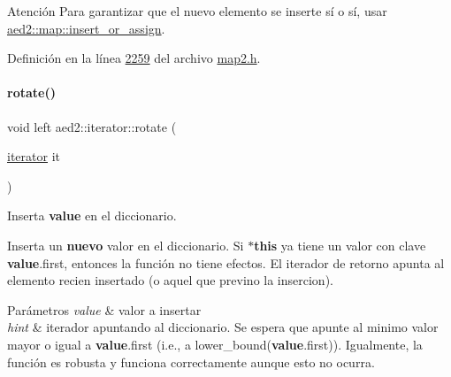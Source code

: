 \begin{DoxyAttention}{Atención}
Para garantizar que el nuevo elemento se inserte sí o sí, usar \hyperlink{classaed2_1_1map_a2ef6723c183916276b0afc4a4c721475_a2ef6723c183916276b0afc4a4c721475}{aed2\+::map\+::insert\+\_\+or\+\_\+assign}. 
\end{DoxyAttention}


Definición en la línea \hyperlink{map2_8h_source_l02259}{2259} del archivo \hyperlink{map2_8h_source}{map2.\+h}.

\mbox{\label{classaed2_1_1iterator_af4e447a081108196ecdf39b16ecb5303_af4e447a081108196ecdf39b16ecb5303}} 
\paragraph{\texorpdfstring{rotate()}{rotate()}\hspace{0.1cm}{\footnotesize\ttfamily [1/2]}}
{\footnotesize\ttfamily void left aed2\+::iterator\+::rotate (\begin{DoxyParamCaption}\item[{\hyperlink{classaed2_1_1iterator_1_1iterator}{iterator}}]{it }\end{DoxyParamCaption})\hspace{0.3cm}{\ttfamily [inline]}}



Inserta {\bfseries value} en el diccionario. 

Inserta un {\bfseries nuevo} valor en el diccionario. Si {\bfseries $\ast$this} ya tiene un valor con clave {\bfseries value}.first, entonces la función no tiene efectos. El iterador de retorno apunta al elemento recien insertado (o aquel que previno la insercion).


\begin{DoxyParams}{Parámetros}
{\em value} & valor a insertar \\
\hline
{\em hint} & iterador apuntando al diccionario. Se espera que apunte al minimo valor mayor o igual a {\bfseries value}.first (i.\+e., a lower\+\_\+bound({\bfseries value}.first)). Igualmente, la función es robusta y funciona correctamente aunque esto no ocurra. \\
\hline
\end{DoxyParams}

